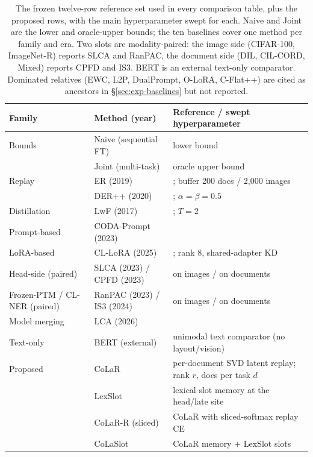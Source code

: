 \begin{table}[!htbp]
  \centering
  \caption[Baseline suite]{The frozen twelve-row reference set used in every comparison
  table, plus the proposed rows, with the main hyperparameter swept for each. Naive and
  Joint are the lower and oracle-upper bounds; the ten baselines cover one method per
  family and era. Two slots are modality-paired: the image side (CIFAR-100, ImageNet-R)
  reports SLCA and RanPAC, the document side (DIL, CIL-CORD, Mixed) reports CPFD and IS3.
  BERT is an external text-only comparator. Dominated relatives (EWC, L2P, DualPrompt,
  O-LoRA, C-Flat++) are cited as ancestors in \S\ref{sec:exp-baselines} but not reported.}
  \label{tab:baselines}
  \begin{tabularx}{\textwidth}{l l L}
    \toprule
    \textbf{Family} & \textbf{Method (year)} & \textbf{Reference / swept hyperparameter} \\
    \midrule
    Bounds         & Naive (sequential FT) & lower bound \\
                   & Joint (multi-task)    & oracle upper bound \\
    Replay         & ER (2019)   & \citet{rolnick2019er}; buffer 200 docs / 2{,}000 images \\
                   & DER++ (2020)& \citet{buzzega2020der}; $\alpha{=}\beta{=}0.5$ \\
    Distillation   & LwF (2017)  & \citet{li2017lwf}; $T{=}2$ \\
    Prompt-based   & CODA-Prompt (2023) & \citet{smith2023coda} \\
    LoRA-based     & CL-LoRA (2025) & \citet{he2025cllora}; rank 8, shared-adapter KD \\
    Head-side (paired) & SLCA (2023) / CPFD (2023) & \citet{zhang2023slca} on images / \citet{zhang2023cpfd} on documents \\
    Frozen-PTM / CL-NER (paired) & RanPAC (2023) / IS3 (2024) & \citet{mcdonnell2023ranpac} on images / \citet{chen2024is3} on documents \\
    Model merging  & LCA (2026)  & \citet{lca2026} \\
    Text-only      & BERT (external) & unimodal text comparator (no layout/vision) \\
    Proposed       & CoLaR & per-document SVD latent replay; rank $r$, docs per task $d$ \\
                   & LexSlot & lexical slot memory at the head/late site \\
                   & CoLaR-R (sliced) & CoLaR with sliced-softmax replay CE \\
                   & CoLaSlot & CoLaR memory $+$ LexSlot slots \\
    \bottomrule
  \end{tabularx}
\end{table}

